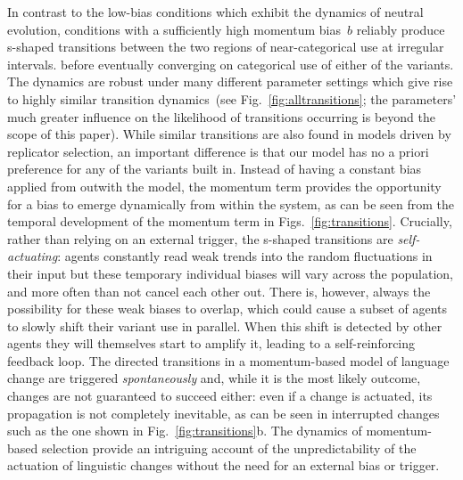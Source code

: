 In contrast to the low-bias conditions which exhibit the dynamics of neutral evolution, conditions with a sufficiently high momentum bias~$b$ reliably produce s-shaped transitions between the two regions of near-categorical use at irregular intervals.
before eventually converging on categorical use of either of the variants. The dynamics are robust under many different parameter settings which give rise to highly similar transition dynamics~(see Fig.~\ref{fig:alltransitions}; the parameters' much greater influence on the likelihood of transitions occurring is beyond the scope of this paper). While similar transitions are also found in models driven by replicator selection, an important difference is that our model has no a priori preference for any of the variants built in. Instead of having a constant bias applied from outwith the model, the momentum term provides the opportunity for a bias to emerge dynamically from within the system, as can be seen from the temporal development of the momentum term in Figs.~\ref{fig:transitions}. Crucially, rather than relying on an external trigger, the s-shaped transitions are \emph{self-actuating}: agents constantly read weak trends into the random fluctuations in their input but these temporary individual biases will vary across the population, and more often than not cancel each other out. There is, however, always the possibility for these weak biases to overlap, which could cause a subset of agents to slowly shift their variant use in parallel. When this shift is detected by other agents they will themselves start to amplify it, leading to a self-reinforcing feedback loop. The directed transitions in a momentum-based model of language change are triggered \emph{spontaneously} and, while it is the most likely outcome, changes are not guaranteed to succeed either: even if a change is actuated, its propagation is not completely inevitable, as can be seen in interrupted changes such as the one shown in Fig.~\ref{fig:transitions}b. The dynamics of momentum-based selection provide an intriguing account of the unpredictability of the actuation of linguistic changes without the need for an external bias or trigger.

